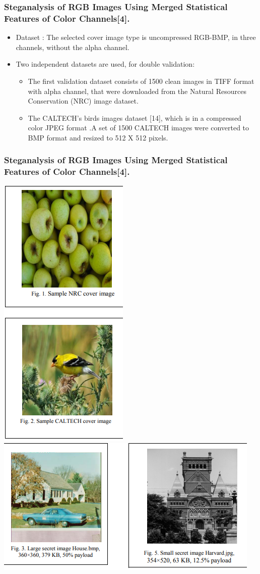 \documentclass{beamer} %
\theoremstyle{definition} %
\begin{document}
\begin{frame}
\frametitle{Steganalysis of RGB Images Using Merged Statistical Features of Color Channels[4].  }
\begin{itemize}
	\item Dataset :  The selected cover image type is uncompressed RGB-BMP, in three channels, without the alpha channel.
	\item Two independent datasets are used, for double validation:
	\begin{itemize}
		\item The first validation dataset consists of 1500 clean images in TIFF format with alpha channel, that were downloaded from the Natural Resources Conservation (NRC) image dataset.
	    \item  The CALTECH’s birds images dataset [14], which is in a compressed color JPEG format .A set of 1500 CALTECH images were converted to BMP format and resized to 512 X 512 pixels.
	\end{itemize}
\end{itemize}
\end{frame}
\begin{frame}
\frametitle{Steganalysis of RGB Images Using Merged Statistical Features of Color Channels[4].}
\includegraphics[scale=0.35]{nrcndcaltech.png}
\includegraphics[scale=0.35]{stegImage.png}
\end{frame}
\end{document}
